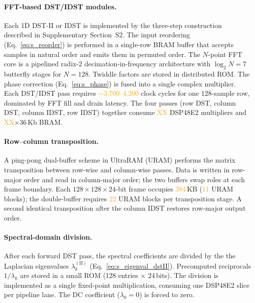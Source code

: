 \documentclass[10pt,a4paper]{article}
\newcommand{\placeholder}[1]{\textcolor{orange}{#1}}
\begin{document}
\paragraph{FFT-based DST/IDST modules.}
Each 1D DST-II or IDST is implemented by the three-step construction described in Supplementary Section~S2. The input reordering (Eq.~\eqref{eq:s_reorder}) is performed in a single-row BRAM buffer that accepts samples in natural order and emits them in permuted order. The $N$-point FFT core is a pipelined radix-2 decimation-in-frequency architecture with $\log_2 N = 7$ butterfly stages for $N = 128$. Twiddle factors are stored in distributed ROM. The phase correction (Eq.~\eqref{eq:s_phase}) is fused into a single complex multiplier. Each DST/IDST pass requires \placeholder{$\sim$3{,}700--4{,}200} clock cycles for one 128-sample row, dominated by FFT fill and drain latency. The four passes (row DST, column DST, column IDST, row IDST) together consume \placeholder{XX} DSP48E2 multipliers and \placeholder{XX}$\times$36\,Kb BRAM.

\paragraph{Row--column transposition.}
A ping-pong dual-buffer scheme in UltraRAM (URAM) performs the matrix transposition between row-wise and column-wise passes. Data is written in row-major order and read in column-major order; the two buffers swap roles at each frame boundary. Each $128 \times 128 \times 24$-bit frame occupies \placeholder{384}\,KB (\placeholder{11} URAM blocks); the double-buffer requires \placeholder{22} URAM blocks per transposition stage. A second identical transposition after the column IDST restores row-major output order.

\paragraph{Spectral-domain division.}
After each forward DST pass, the spectral coefficients are divided by the the Laplacian eigenvalues $\lambda_k^{\mathrm{(II)}}$ (Eq.~\eqref{eq:s_eigenval_dstII}). Precomputed reciprocals $1/\lambda_k$ are stored in a small ROM (128 entries $\times$ 24\,bits). The division is implemented as a single fixed-point multiplication, consuming one DSP48E2 slice per pipeline lane. The DC coefficient ($\lambda_0 = 0$) is forced to zero.
\end{document}
